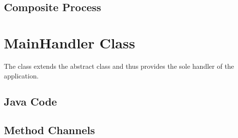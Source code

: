 \documentclass{article}
\begin{document}
\begin{circusbox}

\end{circusbox}

\subsection{Composite Process}

\begin{circusbox}

\end{circusbox}

\section{MainHandler Class}

The  class extends the abstract  class and thus provides the sole handler of the application.

\subsection{Java Code}


\subsection{Method Channels}

\begin{circusbox}

\end{circusbox}
\end{document}
